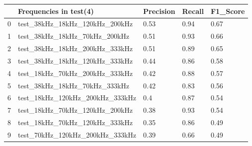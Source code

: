\begin{longtable}{lllll}
\hline
\multicolumn{1}{|l|}{} & \multicolumn{1}{l|}{Frequencies in test(4)} & \multicolumn{1}{l|}{Precision} & \multicolumn{1}{l|}{Recall} & \multicolumn{1}{l|}{F1\_Score} \\ \hline
\endfirsthead
%
\endhead
%
\hline
\endfoot
%
\endlastfoot
%
0                      & test\_38kHz\_18kHz\_120kHz\_200kHz          & 0.53                           & 0.94                        & 0.67                           \\
1                      & test\_38kHz\_18kHz\_70kHz\_200kHz           & 0.51                           & 0.93                        & 0.66                           \\
2                      & test\_38kHz\_18kHz\_200kHz\_333kHz          & 0.51                           & 0.89                        & 0.65                           \\
3                      & test\_38kHz\_18kHz\_120kHz\_333kHz          & 0.44                           & 0.86                        & 0.58                           \\
4                      & test\_18kHz\_70kHz\_200kHz\_333kHz          & 0.42                           & 0.88                        & 0.57                           \\
5                      & test\_38kHz\_18kHz\_70kHz\_333kHz           & 0.42                           & 0.83                        & 0.56                           \\
6                      & test\_18kHz\_120kHz\_200kHz\_333kHz         & 0.4                            & 0.87                        & 0.54                           \\
7                      & test\_18kHz\_70kHz\_120kHz\_200kHz          & 0.38                           & 0.93                        & 0.54                           \\
8                      & test\_18kHz\_70kHz\_120kHz\_333kHz          & 0.35                           & 0.86                        & 0.49                           \\
9                      & test\_70kHz\_120kHz\_200kHz\_333kHz         & 0.39                           & 0.66                        & 0.49                           \\

\end{longtable}
